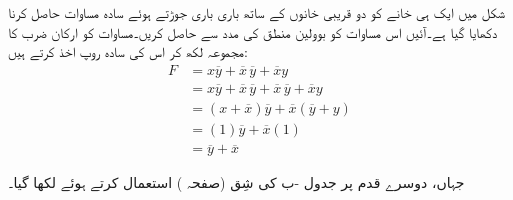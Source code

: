 شکل    میں ایک ہی خانے کو دو قریبی خانوں کے ساتھ باری باری جوڑتے ہوئے سادہ مساوات  حاصل کرنا دکھایا گیا ہے۔آئیں  اس  مساوات کو  بوولین منطق کی مدد سے حاصل کریں۔مساوات کو ارکان ضرب کا مجموعہ لکھ کر اس کی سادہ روپ اخذ کرتے ہیں:
\begin{align*}
F&=x\overline{y}+\overline{x}\,\overline{y}+\overline{x}y\\
&=x\overline{y}+\overline{x}\,\overline{y}+\overline{x}\,\overline{y}+\overline{x}y\\
&=(x+\overline{x})\overline{y}+\overline{x}(\overline{y}+y)\\
&=(1)\overline{y}+\overline{x}(1)\\
&=\overline{y}+\overline{x}
\end{align*}

 جہاں، دوسرے قدم پر   جدول -ب  کی شِق      (صفحہ )  استعمال کرتے
  ہوئے  لکھا گیا۔

